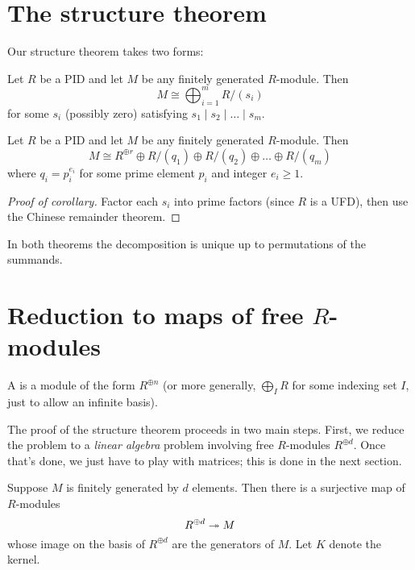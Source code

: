 \section{The structure theorem}
\label{sec:structure_thm}
Our structure theorem takes two forms:
\begin{theorem}
	Let $R$ be a PID and let $M$ be any finitely generated $R$-module. Then
	\[ M \cong \bigoplus_{i=1}^m R/(s_i) \]
	for some $s_i$ (possibly zero)
	satisfying $s_1 \mid s_2 \mid \dots \mid s_m$.
\end{theorem}
\begin{corollary}
	\label{cor:structure_theorem_primary}
	Let $R$ be a PID and let $M$ be any finitely generated $R$-module. Then
	\[ M \cong R^{\oplus r}
		\oplus R/(q_1) \oplus R/(q_2) \oplus \dots \oplus R/(q_m) \]
	where $q_i = p_i^{e_i}$ for some prime element $p_i$ and integer $e_i \ge 1$.
\end{corollary}
\begin{proof}
	[Proof of corollary]
	Factor each $s_i$ into prime factors (since $R$ is a UFD),
	then use the Chinese remainder theorem.
\end{proof}
\begin{remark}
	In both theorems the decomposition is unique up to
	permutations of the summands.
\end{remark}

\section{Reduction to maps of free $R$-modules}
\begin{definition}
	A  is a module of the form $R^{\oplus n}$
	(or more generally, $\bigoplus_I R$ for some indexing set $I$,
	just to allow an infinite basis).
\end{definition}
The proof of the structure theorem proceeds in two main steps.
First, we reduce the problem to a \emph{linear algebra} problem
involving free $R$-modules $R^{\oplus d}$.
Once that's done, we just have to play with matrices;
this is done in the next section.

Suppose $M$ is finitely generated by $d$ elements.
Then there is a surjective map of $R$-modules
\[ R^{\oplus d} \twoheadrightarrow M \]
whose image on the basis of $R^{\oplus d}$ are the generators of $M$.
Let $K$ denote the kernel.

